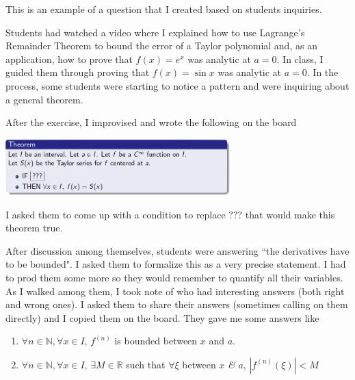 \documentclass[11pt]{article}
\begin{document}
	\begin{example}
		This is an example of a question that I created based on students inquiries.
		\begin{background}
			Students had watched a video where I explained how to use Lagrange's Remainder
			Theorem to bound the error of a Taylor polynomial and, as an application, how
			to prove that ${\displaystyle f(x)=e^x}$ was analytic at $a=0$. In class, I
			guided them through proving that ${\displaystyle f(x)=\sin x}$ was analytic
			at $a=0$. In the process, some students were starting to notice a pattern and
			were inquiring about a general theorem.
		\end{background}
		\vspace{-2mm}
		\begin{question}
			After the exercise, I improvised and wrote the following on the board
			\begin{center}
				\includegraphics[width=0.65\textwidth]{EX5}
			\end{center}
			\vspace{-3mm}
			I asked them to come up with a condition to replace $???$ that would make
			this theorem true.
		\end{question}
		\vspace{-2mm}
		\begin{comments}
			After discussion among themselves, students were answering ``the
			derivatives have to be bounded". I asked them to formalize this as a very
			precise statement. I had to prod them some more so they would remember to quantify
			all their variables. As I walked among them, I took note of who had interesting
			answers (both right and wrong ones). I asked them to share their answers (sometimes
			calling on them directly) and I copied them on the board. They gave me some
			answers like
			\begin{enumerate}
				\item ${\displaystyle \forall n \in \mathbb{N}, \forall x \in I}$,
					$f^{(n)}$ is bounded between $x$ and $a$.

				\item ${\displaystyle \forall n \in \mathbb{N}, \forall x \in I}$,
					$\exists M \in \mathbb{R}$ such that $\forall \xi$ between $x$ \emph{\&}
					$a$, $| f^{(n)}(\xi)| < M$


\end{enumerate}
\end{comments}
\end{example}
\end{document}
